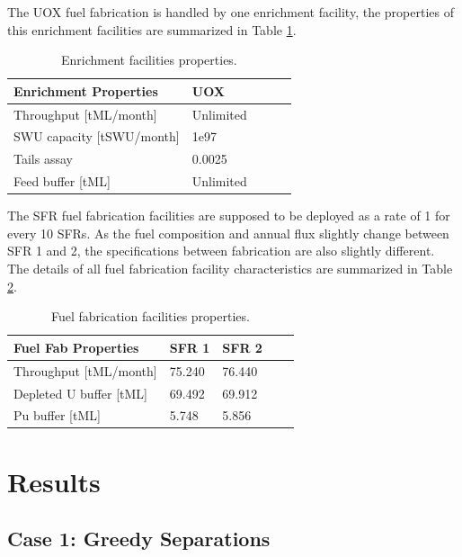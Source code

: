\documentclass[12pt]{article}
\begin{document}
The UOX fuel fabrication is handled by one enrichment facility, the properties
of this enrichment facilities are summarized in Table \ref{tab:enrich_1}.

\begin{table}[h!]
    \centering
    \begin{tabular}{lllll}
    \hline
    Enrichment Properties	&	UOX		\\
    \hline
    Throughput [tML/month]	&	Unlimited	\\
    SWU capacity [tSWU/month]&	1e97		\\
    Tails assay  			&	0.0025	\\
    Feed buffer [tML]	&	Unlimited	\\
    \hline
    \end{tabular}
    \caption{Enrichment facilities properties. }
    \label{tab:enrich_1}
\end{table}



The SFR fuel fabrication facilities are supposed to be deployed as a rate of 1
for every 10 SFRs.  As the fuel composition and annual flux slightly change
between SFR 1 and 2, the specifications between fabrication are also slightly
different. The details of all fuel fabrication facility characteristics are
summarized in Table \ref{tab:fuelfab_1}.

\begin{table}[h!]
    \centering
    \begin{tabular}{lllll}
    \hline
    Fuel Fab Properties	&	SFR 1	&	SFR 2	\\
    \hline
    Throughput [tML/month]	&	75.240	&	76.440	\\
    Depleted U buffer [tML]	&	69.492	&	69.912	\\
    Pu buffer  [tML]		&	5.748	&	5.856	\\
    \hline
    \end{tabular}
    \caption{Fuel fabrication facilities properties.}
    \label{tab:fuelfab_1}
\end{table}


\section{Results}

\subsection{Case 1: Greedy Separations}
\end{document}
